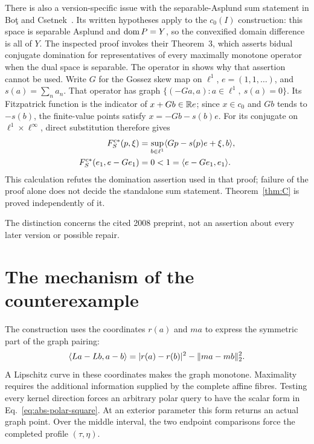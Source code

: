 There is also a version-specific issue with the separable-Asplund sum
statement in Bo\c{t} and Csetnek~\cite[Corollary~11]{botcsetnek2008}.
Its written hypotheses apply to the $c_0(I)$ construction: this space
is separable Asplund and $\operatorname{dom} P=Y$, so the convexified domain difference
is all of $Y$. The inspected proof invokes their Theorem~3, which asserts
bidual conjugate domination for representatives of every maximally
monotone operator when the dual space is separable. The operator in
\cite[author version, Lemma~2.1]{buenosvaiter2011} shows why that assertion cannot be used.
Write $G$ for the Gossez skew map on $\ell^1$, $e=(1,1,\ldots)$, and
$s(a)=\sum_n a_n$. That operator has graph
$\{(-Ga,a):a\in\ell^1,\ s(a)=0\}$. Its Fitzpatrick function is the
indicator of $x+Gb\in\mathbb R e$; since $x\in c_0$ and $Gb$ tends to $-s(b)$,
the finite-value points satisfy $x=-Gb-s(b)e$. For its conjugate on
$\ell^1\times\ell^\infty$, direct substitution therefore gives
\begin{equation}
\begin{aligned}
F_S^{c*}(p,\xi)
 &=\sup_{b\in\ell^1}\langle Gp-s(p)e+\xi,b\rangle,\\
F_S^{c*}(e_1,e-Ge_1)&=0<1=\langle e-Ge_1,e_1\rangle.
\end{aligned}
\label{eq:bidual-interface}
\end{equation}
This calculation refutes the domination assertion used in that proof;
failure of the proof alone does not decide the standalone sum statement.
Theorem~\ref{thm:C} is proved independently of it.

The distinction concerns the cited 2008 preprint, not an assertion about
every later version or possible repair.



\section{The mechanism of the counterexample}
\label{sec:structure}
The construction uses the coordinates $r(a)$ and $ma$ to express the
symmetric part of the graph pairing:
\[
\langle La-Lb,a-b\rangle=|r(a)-r(b)|^2-\|ma-mb\|_2^2.
\]
A Lipschitz curve in these coordinates makes the graph monotone.
Maximality requires the additional information supplied by the complete
affine fibres. Testing every kernel direction forces an arbitrary polar
query to have the scalar form in Eq.~\eqref{eq:abs-polar-square}.
At an exterior parameter this form returns an actual graph point.
Over the middle interval, the two endpoint comparisons force the
completed profile $(\tau,\eta)$.


